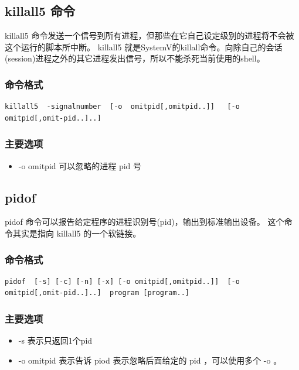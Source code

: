 \subsection{killall5 命令}

killall5
命令发送一个信号到所有进程，但那些在它自己设定级别的进程将不会被这个运行的脚本所中断。
killall5
就是SystemV的killall命令。向除自己的会话(session)进程之外的其它进程发出信号，所以不能杀死当前使用的shell。

\subsubsection{命令格式}

{\begin{shaded}\begin{verbatim}
killall5  -signalnumber  [-o  omitpid[,omitpid..]]   [-o omitpid[,omit‐pid..]..]
\end{verbatim}\end{shaded}}
\subsubsection{主要选项}

\begin{itemize}
\item
  -o omitpid 可以忽略的进程 pid 号
\end{itemize}
\subsection{pidof}

pidof 命令可以报告给定程序的进程识别号(pid)，输出到标准输出设备。
这个命令其实是指向 killall5 的一个软链接。

\subsubsection{命令格式}

{\begin{shaded}\begin{verbatim}
pidof  [-s] [-c] [-n] [-x] [-o omitpid[,omitpid..]]  [-o omitpid[,omit‐pid..]..]  program [program..]
\end{verbatim}\end{shaded}}
\subsubsection{主要选项}

\begin{itemize}
\item
  -s 表示只返回1个pid
\item
  -o omitpid 表示告诉 piod 表示忽略后面给定的 pid ，可以使用多个 -o 。
\end{itemize}
